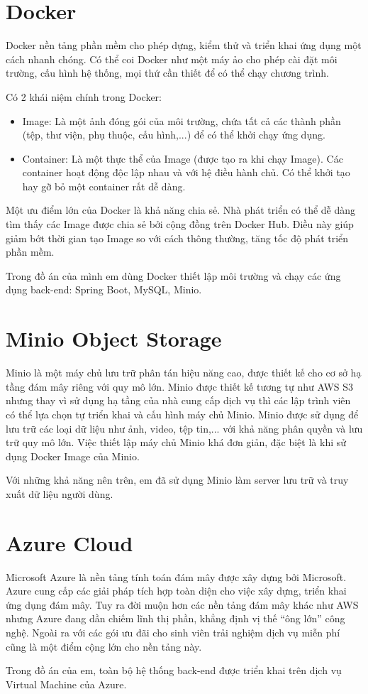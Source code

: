 \documentclass[../Main.tex]{subfiles}
\begin{document}
\section{Docker}
Docker \cite{Docker} nền tảng phần mềm cho phép dựng, kiểm thử và triển khai ứng dụng một cách nhanh chóng. Có thể coi Docker như một máy ảo cho phép cài đặt môi trường, cấu hình hệ thống, mọi thứ cần thiết để có thể chạy chương trình.

Có 2 khái niệm chính trong Docker: 
\begin{itemize}
    \item Image: Là một ảnh đóng gói của môi trường, chứa tất cả các thành phần (tệp, thư viện, phụ thuộc, cấu hình,...) để có thể khởi chạy ứng dụng.
    \item Container: Là một thực thể của Image (được tạo ra khi chạy Image). Các container hoạt động độc lập nhau và với hệ điều hành chủ. Có thể khởi tạo hay gỡ bỏ một container rất dễ dàng.
\end{itemize}

Một ưu điểm lớn của Docker là khả năng chia sẻ. Nhà phát triển có thể dễ dàng tìm thấy các Image được chia sẻ bởi cộng đồng trên Docker Hub. Điều này giúp giảm bớt thời gian tạo Image so với cách thông thường, tăng tốc độ phát triển phần mềm.

Trong đồ án của mình em dùng Docker thiết lập môi trường và chạy các ứng dụng back-end: Spring Boot, MySQL, Minio.

\section{Minio Object Storage}
Minio \cite{Minio} là một máy chủ lưu trữ phân tán hiệu năng cao, được thiết kế cho
cơ sở hạ tầng đám mây riêng với quy mô lớn. Minio được thiết kế tương tự như AWS S3 nhưng thay vì sử dụng hạ tầng của nhà cung cấp dịch vụ thì các lập trình viên có thể lựa chọn tự triển khai và cấu hình máy chủ Minio. Minio được sử dụng để lưu trữ các loại dữ liệu như ảnh, video, tệp tin,... với khả năng phân quyền và lưu trữ quy mô lớn. Việc thiết lập máy chủ Minio khá đơn giản, đặc biệt là khi sử dụng Docker Image của Minio.

Với những khả năng nên trên, em đã sử dụng Minio làm server lưu trữ và truy xuất  dữ liệu người dùng.
 
\section{Azure Cloud}
Microsoft Azure \cite{Azure} là nền tảng tính toán đám mây được xây dựng bởi Microsoft. Azure cung cấp các giải pháp tích hợp toàn diện cho việc xây dựng, triển khai ứng dụng đám mây. Tuy ra đời muộn hơn các nền tảng đám mây khác như AWS nhưng Azure đang dần chiếm lĩnh thị phần, khẳng định vị thế “ông lớn” công nghệ. Ngoài ra với các gói ưu đãi cho sinh viên trải nghiệm dịch vụ miễn phí cũng là một điểm cộng lớn cho nền tảng này. 

Trong đồ án của em, toàn bộ hệ thống back-end được triển khai trên dịch vụ Virtual Machine của Azure.
\end{document}
